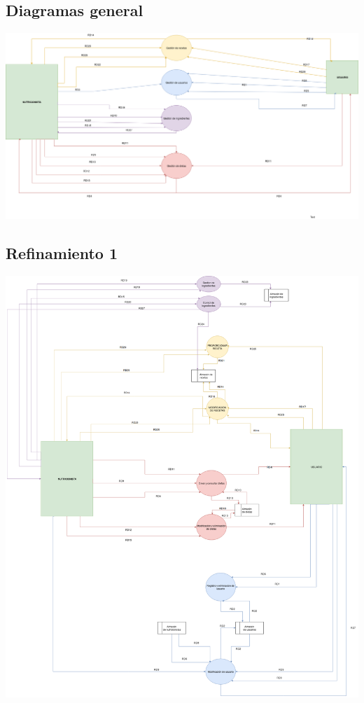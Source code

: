 \documentclass[12pt,letterpaper]{article}
\begin{document}
\subsection{Diagramas general}
\includegraphics[scale=0.3]{Refinamiento_0.png}
\subsection{Refinamiento 1}
\includegraphics[scale=0.3]{Refinamiento_1.png}
\end{document}
